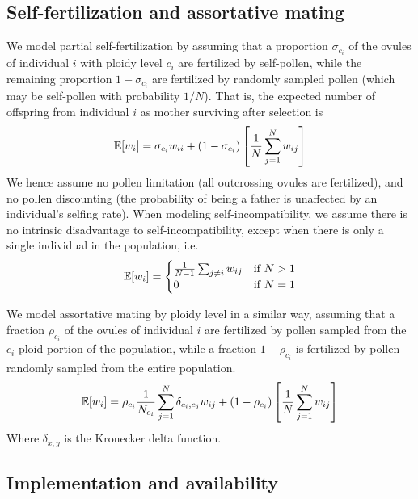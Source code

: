 \documentclass[12pt,a4paper]{article}
\begin{document}
    \subsection*{Self-fertilization and assortative mating}

    We model partial self-fertilization by assuming that a proportion
    $\sigma_{c_i}$ of the ovules of individual $i$ with ploidy level $c_i$ are
    fertilized by self-pollen, while the remaining proportion $1-\sigma_{c_i}$ are
    fertilized by randomly sampled pollen (which may be self-pollen with
    probability $1/N$). 
    That is, the expected number of offspring from individual $i$ as mother
    surviving after selection is
    \begin{equation}
    \mathbb{E}[w_i] = \sigma_{c_i} w_{ii} +
      (1-\sigma_{c_i})\left[\frac{1}{N}\sum_{j=1}^N w_{ij}\right]
    \end{equation}
    We hence assume no pollen limitation (all outcrossing ovules are fertilized),
    and no pollen discounting (the probability of being a father is unaffected by
    an individual's selfing rate).
    When modeling self-incompatibility, we assume there is no intrinsic
    disadvantage to self-incompatibility, except when there is only a single
    individual in the population, i.e.
    \begin{equation}
    \mathbb{E}[w_i] = \begin{cases}
        \frac{1}{N-1}\sum_{j \ne i }w_{ij} & \text{if } N > 1\\ 
        0 & \text{if } N=1 \end{cases}
    \end{equation}

    We model assortative mating by ploidy level in a similar way, assuming that a
    fraction $\rho_{c_i}$ of the ovules of individual $i$ are fertilized by pollen
    sampled from the $c_i$-ploid portion of the population, while a fraction
    $1-\rho_{c_i}$ is fertilized by pollen randomly sampled from the entire
    population.
    \begin{equation}
    \mathbb{E}[w_i] = \rho_{c_i} \frac{1}{N_{c_{i}}} \sum_{j=1}^N \delta_{c_i,c_j}w_{ij}
     + (1-\rho_{c_i})
    \left[\frac{1}{N}\sum_{j=1}^N w_{ij}\right]
    \end{equation}
    Where $\delta_{x,y}$ is the Kronecker delta function.

    \subsection*{Implementation and availability}
\end{document}
